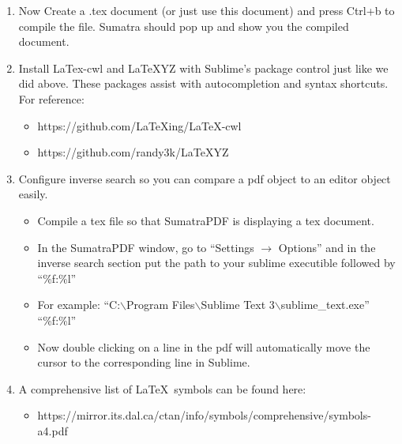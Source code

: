 \documentclass{article}
\begin{document}
\begin{enumerate}
\item Now Create a .tex document (or just use this document) and press Ctrl+b to compile the file. Sumatra should pop up and show you the compiled document.

\item Install LaTex-cwl and LaTeXYZ with Sublime's package control just like we did above. These packages assist with autocompletion and syntax shortcuts. For reference:
	\begin{itemize}
	\item https://github.com/LaTeXing/LaTeX-cwl
	\item https://github.com/randy3k/LaTeXYZ
	\end{itemize}

\item Configure inverse search so you can compare a pdf object to an editor object easily.
	\begin{itemize}
	\item Compile a tex file so that SumatraPDF is displaying a tex document.
	\item In the SumatraPDF window, go to ``Settings $\rightarrow$ Options'' and in the inverse search section put the path to your sublime executible followed by ``\%f:\%l''
	\item For example: ``C:$ \backslash $Program Files$ \backslash $Sublime Text 3$ \backslash $sublime\_text.exe'' ``\%f:\%l''
	\item Now double clicking on a line in the pdf will automatically move the cursor to the corresponding line in Sublime.
	\end{itemize}

\item A comprehensive list of \LaTeX \ symbols can be found here:
	\begin{itemize}
	\item https://mirror.its.dal.ca/ctan/info/symbols/comprehensive/symbols-a4.pdf
	\end{itemize}
\end{enumerate}
\end{document}
